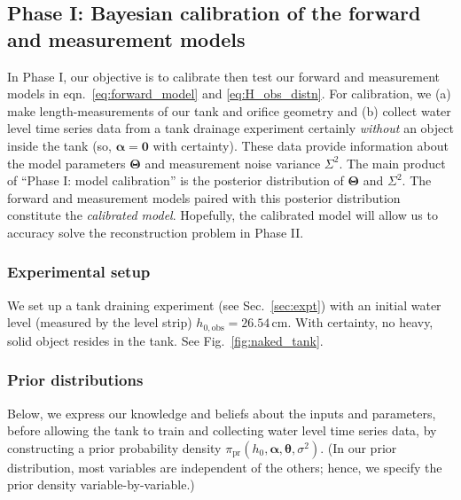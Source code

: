 \documentclass[openacc]{rsproca_new}%
\begin{document}
\subsection{Phase I: Bayesian calibration of the forward and measurement models}
\label{sec:phaseI}
In Phase I, our objective is to calibrate then test our forward and measurement models in eqn.~\ref{eq:forward_model} and \ref{eq:H_obs_distn}.
For calibration, we (a) make length-measurements of our tank and orifice geometry and (b) collect water level time series data from a tank drainage experiment certainly \emph{without} an object inside the tank (so, $\boldsymbol \alpha = \mathbf{0}$ with certainty).
These data provide information about the model parameters $\boldsymbol \Theta$ and measurement noise variance $\Sigma^2$. 
The main product of ``Phase I: model calibration'' is the posterior distribution of $\boldsymbol \Theta$ and $\Sigma^2$.
The forward and measurement models paired with this posterior distribution constitute the \emph{calibrated model}. 
Hopefully, the calibrated model will allow us to accuracy solve the reconstruction problem in Phase II. 

\subsubsection{Experimental setup}
We set up a tank draining experiment (see Sec.~\ref{sec:expt}) with an initial water level (measured by the level strip) $h_{0, \text{obs}}=26.54$\,cm. 
With certainty, no heavy, solid object resides in the tank. 
See Fig.~\ref{fig:naked_tank}.

\subsubsection{Prior distributions} 
Below, we express our knowledge and beliefs about the inputs and parameters, before allowing the tank to train and collecting water level time series data, by constructing a prior probability density $\pi_{\text{pr}}(h_0, \boldsymbol \alpha, \boldsymbol \theta, \sigma^2)$. (In our prior distribution, most variables are independent of the others; hence, we specify the prior density variable-by-variable.)
\end{document}
